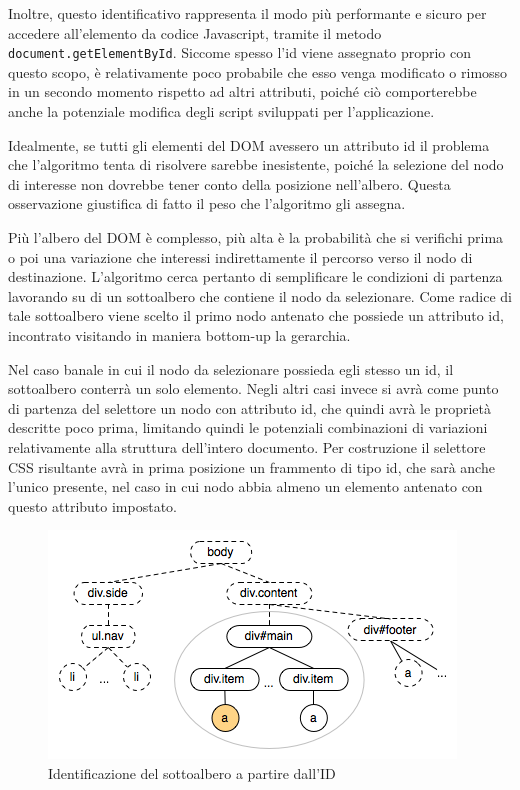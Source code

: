 Inoltre, questo identificativo rappresenta il modo più performante e sicuro per accedere all'elemento da codice Javascript, tramite il metodo \verb|document.getElementById|. Siccome spesso l'id viene assegnato proprio con questo scopo, è relativamente poco probabile che esso venga modificato o rimosso in un secondo momento rispetto ad altri attributi, poiché ciò comporterebbe anche la potenziale modifica degli script sviluppati per l'applicazione.

Idealmente, se tutti gli elementi del DOM avessero un attributo id il problema che l'algoritmo tenta di risolvere sarebbe inesistente, poiché la selezione del nodo di interesse non dovrebbe tener conto della posizione nell'albero. Questa osservazione giustifica di fatto il peso che l'algoritmo gli assegna. 

Più l'albero del DOM è complesso, più alta è la probabilità che si verifichi prima o poi una variazione che interessi indirettamente il percorso verso il nodo di destinazione. L'algoritmo cerca pertanto di semplificare le condizioni di partenza lavorando su di un sottoalbero che contiene il nodo da selezionare. Come radice di tale sottoalbero viene scelto il primo nodo antenato che possiede un attributo id, incontrato visitando in maniera bottom-up la gerarchia. 

Nel caso banale in cui il nodo da selezionare possieda egli stesso un id, il sottoalbero conterrà un solo elemento. Negli altri casi invece si avrà come punto di partenza del selettore un nodo con attributo id, che quindi avrà le proprietà descritte poco prima, limitando quindi le potenziali combinazioni di variazioni relativamente alla struttura dell'intero documento. Per costruzione il selettore CSS risultante avrà in prima posizione un frammento di tipo id, che sarà anche l'unico presente, nel caso in cui nodo abbia almeno un elemento antenato con questo attributo impostato. 

\begin{figure}[htbp]
\begin{center}
\includegraphics{images/id_partition.png}
\caption{Identificazione del sottoalbero a partire dall'ID}
\label{fig:idPartition}
\end{center}
\end{figure}

